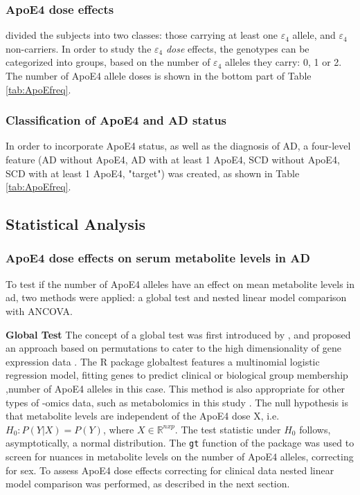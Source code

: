 \documentclass{amsart}
\begin{document}
\subsubsection{ApoE4 dose effects}
\citeauthor{deLeeuw2017Blood-basedDisease} divided the subjects into two classes: those carrying at least one $\varepsilon_4$ allele, and $\varepsilon_4$ non-carriers. In order to study the $\varepsilon_4$ \textit{dose} effects, the genotypes can be categorized into groups, based on the number of $\varepsilon_4$ alleles they carry: 0, 1 or 2. The number of ApoE4 allele doses is shown in the bottom part of Table \ref{tab:ApoEfreq}.

\subsubsection{Classification of ApoE4 and AD status}
In order to incorporate ApoE4 status, as well as the diagnosis of AD, a four-level feature (AD without ApoE4, AD with at least 1 ApoE4, SCD without ApoE4, SCD with at least 1 ApoE4, "target") was created, as shown in Table \ref{tab:ApoEfreq}.

\subsection{Statistical Analysis} \label{stats}
\subsubsection{ApoE4 dose effects on serum metabolite levels in AD} \label{rq1}
To test if the number of ApoE4 alleles have an effect on mean metabolite levels in \acrshort{ad}, two methods were applied: a global test and nested linear model comparison with ANCOVA.

\leavevmode\newline\textbf{Global Test}\hspace{.25cm} The concept of a global test was first introduced by \citeauthor{Simon2004DesignHealth}, and proposed an approach based on permutations to cater to the high dimensionality of gene expression data \cite{Simon2004DesignHealth}. The R package \textsf{globaltest} features a multinomial logistic regression model, fitting genes to predict clinical or biological group membership \cite{Goeman2004AOutcome, Goeman2006TestingAlternative, Goeman2023ThePackage},number of ApoE4 alleles in this case. This method is also appropriate for other types of -omics data, such as metabolomics in this study \cite{Goeman2023ThePackage}. The null hypothesis is that metabolite levels are independent of the ApoE4 dose X, i.e. $H_0 : P(Y|X) = P(Y)$, where $X \in \mathbb{R}^{n x p}$. The test statistic under $H_0$ follows, asymptotically, a normal distribution. The \texttt{gt} function of the package was used to screen for nuances in metabolite levels on the number of ApoE4 alleles, correcting for sex. To assess ApoE4 dose effects correcting for clinical data nested linear model comparison was performed, as described in the next section.
\end{document}
